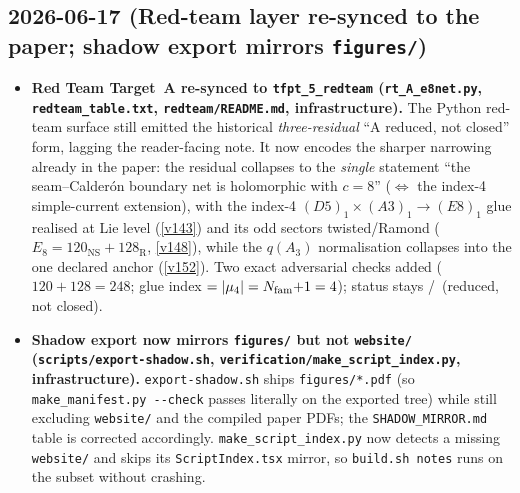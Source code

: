 \subsection*{2026-06-17 (Red-team layer re-synced to the paper; shadow export mirrors \texttt{figures/})}
\begin{itemize}
\item \textbf{Red Team Target~A re-synced to \texttt{tfpt\_5\_redteam} (\texttt{rt\_A\_e8net.py},
  \texttt{redteam\_table.txt}, \texttt{redteam/README.md}, infrastructure).} The Python red-team
  surface still emitted the historical \emph{three-residual} ``A reduced, not closed'' form, lagging the
  reader-facing note. It now encodes the sharper narrowing already in the paper: the residual collapses to
  the \emph{single} statement ``the seam--Calder\'on boundary net is holomorphic with $c=8$'' ($\Leftrightarrow$
  the index-4 simple-current extension), with the index-4 $(D5)_1\times(A3)_1\to(E8)_1$ glue realised at Lie
  level (\vref{v143}) and its odd sectors twisted/Ramond ($E_8=120_{\mathrm{NS}}+128_{\mathrm{R}}$, \vref{v148}),
  while the $q(A_3)$ normalisation collapses into the one declared anchor (\vref{v152}). Two exact adversarial
  checks added ($120{+}128=248$; glue index $=|\mu_4|=N_{\mathrm{fam}}{+}1=4$); status stays \mC/\mO\ (reduced, not closed).
\item \textbf{Shadow export now mirrors \texttt{figures/} but not \texttt{website/}
  (\texttt{scripts/export-shadow.sh}, \texttt{verification/make\_script\_index.py}, infrastructure).}
  \texttt{export-shadow.sh} ships \texttt{figures/*.pdf} (so \texttt{make\_manifest.py -{}-check} passes
  literally on the exported tree) while still excluding \texttt{website/} and the compiled paper PDFs; the
  \texttt{SHADOW\_MIRROR.md} table is corrected accordingly. \texttt{make\_script\_index.py} now detects a
  missing \texttt{website/} and skips its \texttt{ScriptIndex.tsx} mirror, so \texttt{build.sh notes} runs on
  the subset without crashing.
\end{itemize}

